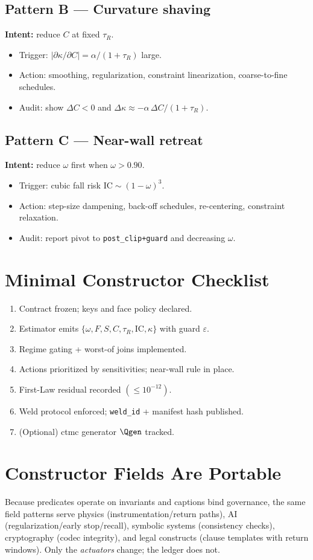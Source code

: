 \subsection*{Pattern B — Curvature shaving}
\textbf{Intent:} reduce \(C\) at fixed \(\tau_{R}\).
\begin{itemize}[leftmargin=1.25em]
  \item Trigger: \(|\partial\kappa/\partial C|=\alpha/(1+\tau_{R})\) large.
  \item Action: smoothing, regularization, constraint linearization, coarse-to-fine schedules.
  \item Audit: show \(\Delta C<0\) and \(\Delta\kappa\approx -\alpha\,\Delta C/(1+\tau_{R})\).
\end{itemize}

\subsection*{Pattern C — Near-wall retreat}
\textbf{Intent:} reduce \(\omega\) first when \(\omega>0.90\).
\begin{itemize}[leftmargin=1.25em]
  \item Trigger: cubic fall risk \(\mathrm{IC}\sim(1-\omega)^3\).
  \item Action: step-size dampening, back-off schedules, re-centering, constraint relaxation.
  \item Audit: report pivot to \texttt{post\_clip+guard} and decreasing \(\omega\).
\end{itemize}

\section{Minimal Constructor Checklist}
\begin{enumerate}[leftmargin=1.25em]
  \item Contract frozen; keys and face policy declared.
  \item Estimator emits \(\{\omega,F,S,C,\tau_{R},\mathrm{IC},\kappa\}\) with guard \(\varepsilon\).
  \item Regime gating + worst-of joins implemented.
  \item Actions prioritized by sensitivities; near-wall rule in place.
  \item First-Law residual recorded \((\le 10^{-12})\).
  \item Weld protocol enforced; \texttt{weld\_id} + manifest hash published.
  \item (Optional) \gls{ctmc} generator \(\Qgen\) tracked.
\end{enumerate}

\section{Constructor Fields Are Portable}
Because predicates operate on invariants and captions bind governance, the same field patterns serve physics (instrumentation/return paths), AI (regularization/early stop/recall), symbolic systems (consistency checks), cryptography (codec integrity), and legal constructs (clause templates with return windows). Only the \emph{actuators} change; the ledger does not.
